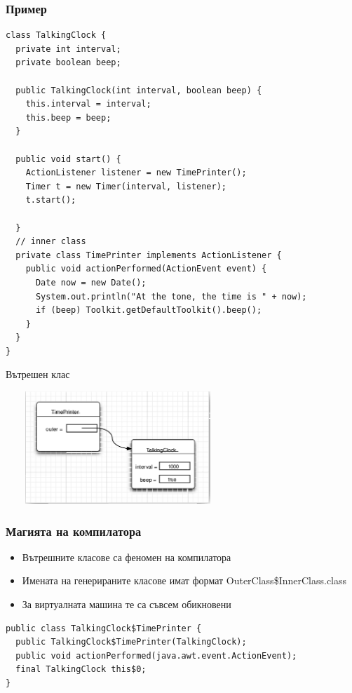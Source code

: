 \documentclass{beamer}
\begin{document}
\begin{frame}[fragile]
  \frametitle{Пример}
  
\begin{lstlisting}[basicstyle=\tiny]
class TalkingClock {
  private int interval;
  private boolean beep;

  public TalkingClock(int interval, boolean beep) {
    this.interval = interval;
    this.beep = beep;
  }
  
  public void start() {
    ActionListener listener = new TimePrinter();
    Timer t = new Timer(interval, listener);
    t.start();
  
  }
  // inner class
  private class TimePrinter implements ActionListener {
    public void actionPerformed(ActionEvent event) {
      Date now = new Date();
      System.out.println("At the tone, the time is " + now);
      if (beep) Toolkit.getDefaultToolkit().beep();
    }
  }
}
\end{lstlisting}
\end{frame}


\begin{frame}{Вътрешен клас}
  
  \includegraphics[width=320px,height=160px]{images/inner-class.png}
\end{frame}

\begin{frame}[fragile]
  \frametitle{Магията на компилатора}
  
\begin{itemize}
  \item Вътрешните класове са феномен на компилатора
  \item Имената на генерираните класове имат формат OuterClass\$InnerClass.class
  \item За виртуалната машина те са съвсем обикновени
\end{itemize}

\begin{lstlisting}
public class TalkingClock$TimePrinter {
  public TalkingClock$TimePrinter(TalkingClock);
  public void actionPerformed(java.awt.event.ActionEvent);
  final TalkingClock this$0;
}
\end{lstlisting}
\end{frame}
\end{document}
